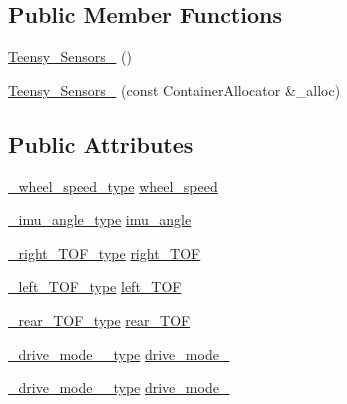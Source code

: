 \subsection*{Public Member Functions}
\begin{DoxyCompactItemize}
\item 
\hyperlink{structsemi__truck_1_1_teensy___sensors___a6c5e97f6398548c5bdaebcba271a3e45}{Teensy\+\_\+\+Sensors\+\_\+} ()
\item 
\hyperlink{structsemi__truck_1_1_teensy___sensors___a629bceff34222229769c25ed8f074531}{Teensy\+\_\+\+Sensors\+\_\+} (const Container\+Allocator \&\+\_\+alloc)
\end{DoxyCompactItemize}
\subsection*{Public Attributes}
\begin{DoxyCompactItemize}
\item 
\hyperlink{structsemi__truck_1_1_teensy___sensors___adca9245fde7f0f8121fed20243c9ae1a}{\+\_\+wheel\+\_\+speed\+\_\+type} \hyperlink{structsemi__truck_1_1_teensy___sensors___adbe8f5f099fb3077164702fc3af3c739}{wheel\+\_\+speed}
\item 
\hyperlink{structsemi__truck_1_1_teensy___sensors___aaf882f7b6732e41e25877c88eb8a1c7a}{\+\_\+imu\+\_\+angle\+\_\+type} \hyperlink{structsemi__truck_1_1_teensy___sensors___a329db78dcc3e9b42a390c48fdf99784e}{imu\+\_\+angle}
\item 
\hyperlink{structsemi__truck_1_1_teensy___sensors___adb98ef7b91b8a2c8346a2b36e1816a61}{\+\_\+right\+\_\+\+T\+O\+F\+\_\+type} \hyperlink{structsemi__truck_1_1_teensy___sensors___acd1bf8a8cdb1073974200b6ae0c7a179}{right\+\_\+\+T\+OF}
\item 
\hyperlink{structsemi__truck_1_1_teensy___sensors___ad6ac104c65141acb58bf4af051941136}{\+\_\+left\+\_\+\+T\+O\+F\+\_\+type} \hyperlink{structsemi__truck_1_1_teensy___sensors___a202e466979b2978e09428a512337433f}{left\+\_\+\+T\+OF}
\item 
\hyperlink{structsemi__truck_1_1_teensy___sensors___ab8ba6b899ad8e9de101aa904e646d7e9}{\+\_\+rear\+\_\+\+T\+O\+F\+\_\+type} \hyperlink{structsemi__truck_1_1_teensy___sensors___aaed96e5feb07aa8a729524f2b643a4c9}{rear\+\_\+\+T\+OF}
\item 
\hyperlink{structsemi__truck_1_1_teensy___sensors___afd1593af87fe24f82e4cdc3db0695f0d}{\+\_\+drive\+\_\+mode\+\_\+\_\+type} \hyperlink{structsemi__truck_1_1_teensy___sensors___a66b7de9953916baf991d662f58b6d24d}{drive\+\_\+mode\+\_}
\item 
\hyperlink{structsemi__truck_1_1_teensy___sensors___aca8d2a953d712ec418fb0d13877b7194}{\+\_\+drive\+\_\+mode\+\_\+\_\+type} \hyperlink{structsemi__truck_1_1_teensy___sensors___a199ab1bba03a7b86615cc5a5aa197557}{drive\+\_\+mode\+\_}
\end{DoxyCompactItemize}


